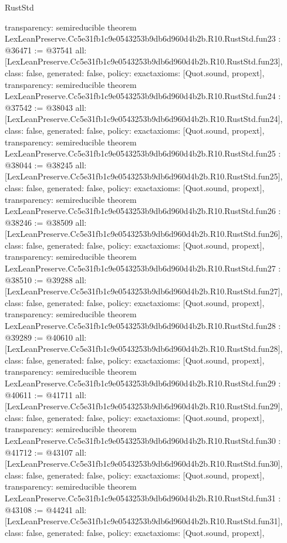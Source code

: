 \begin{lexlean}{RustStd}
\begin{coremodule}
{  transparency: semireducible
}
theorem LexLeanPreserve.Cc5e31fb1c9e0543253b9db6d960d4b2b.R10.RustStd.fun23 : @36471 := @37541 {
  all: [LexLeanPreserve.Cc5e31fb1c9e0543253b9db6d960d4b2b.R10.RustStd.fun23],
  class: false,
  generated: false,
  policy: exact{axioms: [Quot.sound, propext]},
  transparency: semireducible
}
theorem LexLeanPreserve.Cc5e31fb1c9e0543253b9db6d960d4b2b.R10.RustStd.fun24 : @37542 := @38043 {
  all: [LexLeanPreserve.Cc5e31fb1c9e0543253b9db6d960d4b2b.R10.RustStd.fun24],
  class: false,
  generated: false,
  policy: exact{axioms: [Quot.sound, propext]},
  transparency: semireducible
}
theorem LexLeanPreserve.Cc5e31fb1c9e0543253b9db6d960d4b2b.R10.RustStd.fun25 : @38044 := @38245 {
  all: [LexLeanPreserve.Cc5e31fb1c9e0543253b9db6d960d4b2b.R10.RustStd.fun25],
  class: false,
  generated: false,
  policy: exact{axioms: [Quot.sound, propext]},
  transparency: semireducible
}
theorem LexLeanPreserve.Cc5e31fb1c9e0543253b9db6d960d4b2b.R10.RustStd.fun26 : @38246 := @38509 {
  all: [LexLeanPreserve.Cc5e31fb1c9e0543253b9db6d960d4b2b.R10.RustStd.fun26],
  class: false,
  generated: false,
  policy: exact{axioms: [Quot.sound, propext]},
  transparency: semireducible
}
theorem LexLeanPreserve.Cc5e31fb1c9e0543253b9db6d960d4b2b.R10.RustStd.fun27 : @38510 := @39288 {
  all: [LexLeanPreserve.Cc5e31fb1c9e0543253b9db6d960d4b2b.R10.RustStd.fun27],
  class: false,
  generated: false,
  policy: exact{axioms: [Quot.sound, propext]},
  transparency: semireducible
}
theorem LexLeanPreserve.Cc5e31fb1c9e0543253b9db6d960d4b2b.R10.RustStd.fun28 : @39289 := @40610 {
  all: [LexLeanPreserve.Cc5e31fb1c9e0543253b9db6d960d4b2b.R10.RustStd.fun28],
  class: false,
  generated: false,
  policy: exact{axioms: [Quot.sound, propext]},
  transparency: semireducible
}
theorem LexLeanPreserve.Cc5e31fb1c9e0543253b9db6d960d4b2b.R10.RustStd.fun29 : @40611 := @41711 {
  all: [LexLeanPreserve.Cc5e31fb1c9e0543253b9db6d960d4b2b.R10.RustStd.fun29],
  class: false,
  generated: false,
  policy: exact{axioms: [Quot.sound, propext]},
  transparency: semireducible
}
theorem LexLeanPreserve.Cc5e31fb1c9e0543253b9db6d960d4b2b.R10.RustStd.fun30 : @41712 := @43107 {
  all: [LexLeanPreserve.Cc5e31fb1c9e0543253b9db6d960d4b2b.R10.RustStd.fun30],
  class: false,
  generated: false,
  policy: exact{axioms: [Quot.sound, propext]},
  transparency: semireducible
}
theorem LexLeanPreserve.Cc5e31fb1c9e0543253b9db6d960d4b2b.R10.RustStd.fun31 : @43108 := @44241 {
  all: [LexLeanPreserve.Cc5e31fb1c9e0543253b9db6d960d4b2b.R10.RustStd.fun31],
  class: false,
  generated: false,
  policy: exact{axioms: [Quot.sound, propext]},
}
\end{coremodule}
\end{lexlean}
